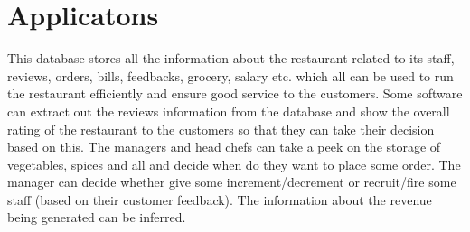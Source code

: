\newpage
\section{Applicatons} \label{cap:application}

This database stores all the information about the restaurant related to its staff, reviews, orders, bills, feedbacks, grocery, salary etc. which all can be used to run the restaurant efficiently and ensure good service to the customers. Some software can extract out the reviews information from the database and show the overall rating of the restaurant to the customers so that they can take their decision based on this. The managers and head chefs can take a peek on the storage of vegetables, spices and all and decide when do they want to place some order. The manager can decide whether give some increment/decrement or recruit/fire some staff (based on their customer feedback). The information about the revenue being generated can be inferred.
